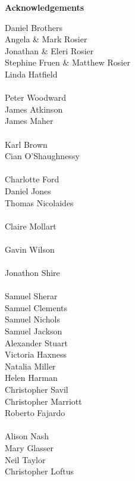 \thispagestyle{empty}

\begin{center}
    {\LARGE\bf Acknowledgements}
\end{center}
Daniel Brothers\\
Angela \& Mark Rosier\\
Jonathan \& Eleri Rosier\\
Stephine Fruen \& Matthew Rosier\\
Linda Hatfield\\
\\
Peter Woodward\\
James Atkinson\\
James Maher\\
\\
Karl Brown\\
Cian O'Shaughnessy\\
\\
Charlotte Ford\\
Daniel Jones\\
Thomas Nicolaides\\
\\
Claire Mollart\\
\\
Gavin Wilson\\
\\
Jonathon Shire\\
\\
Samuel Sherar\\
Samuel Clements\\
Samuel Nichols\\
Samuel Jackson\\
Alexander Stuart\\
Victoria Haxness\\
Natalia Miller\\
Helen Harman\\
Christopher Savil\\
Christopher Marriott\\
Roberto Fajardo\\
\\
Alison Nash\\
Mary Glasser\\
Neil Taylor\\
Christopher Loftus\\